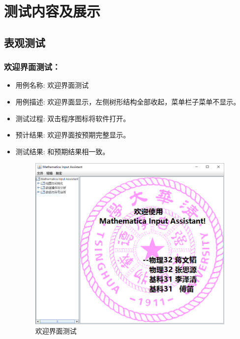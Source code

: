 \documentclass[hyperref, UTF8
,bookmarksnumbered=true, oneside]{ctexbook}
\begin{document}


\chapter{测试内容及展示}

	\section{表观测试} %
		\subsection{欢迎界面测试：} %
		\begin{itemize}
			\item 用例名称: 欢迎界面测试
			\item 用例描述: 欢迎界面显示，左侧树形结构全部收起，菜单栏子菜单不显示。
			\item 测试过程: 双击程序图标将软件打开。
			\item 预计结果: 欢迎界面按预期完整显示。
			\item 测试结果:	和预期结果相一致。

				\begin{figure}[!h]
                	\centering
                	\includegraphics[width=4in]{1.png}
                	\caption{欢迎界面测试}    
                	\label{pic:MathObject}
            	\end{figure}

		\end{itemize}
		
\end{document}

